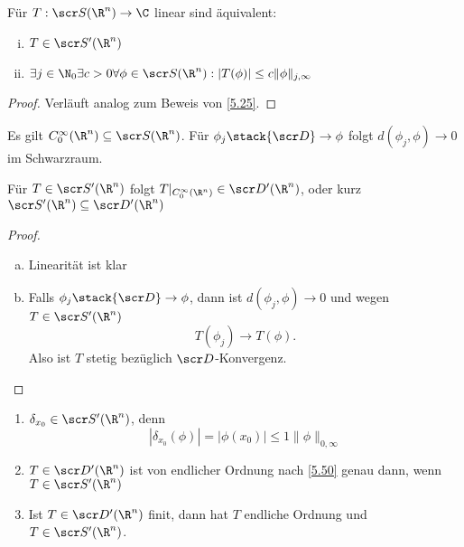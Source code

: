 \begin{st} \label{5.50}
	Für $T : \scr S(\R^n) \to \C$ linear sind äquivalent:
	\begin{enumerate}[(i)]
		\item
			$T \in \scr S'(\R^n)$
		\item
			$\displaystyle \exists j \in \N_0 \exists c > 0 \forall \phi \in \scr S(\R^n) : |T(\phi)| \le c \| \phi\|_{j,\infty}$
	\end{enumerate}
	\begin{proof}
		Verläuft analog zum Beweis von \ref{5.25}.
	\end{proof}
\end{st}

\begin{nt}
	Es gilt $C_0^\infty(\R^n) \subset \scr S(\R^n)$.
	Für $\phi_j \stack{\scr D} \to \phi$ folgt $d(\phi_j, \phi) \to 0$ im Schwarzraum.

	Für $T \in \scr S'(\R^n)$ folgt $T|_{C_0^\infty(\R^n)} \in \scr D'(\R^n)$, oder kurz $\scr S'(\R^n) \subset \scr D'(\R^n)$
	\begin{proof}
		\begin{enumerate}[a)]
			\item
				Linearität ist klar
			\item
				Falls $\phi_j \stack{\scr D}\to \phi$, dann ist $d(\phi_j, \phi) \to 0$ und wegen $T \in \scr S'(\R^n)$
				\[
					T(\phi_j) \to T(\phi).
				\]
				Also ist $T$ stetig bezüglich $\scr D$-Konvergenz.
		\end{enumerate}
	\end{proof}
\end{nt}

\begin{ex} \label{5.52}
	\begin{enumerate}[1)]
		\item
			$\delta_{x_0} \in \scr S'(\R^n)$, denn
			\[
				|\delta_{x_0}(\phi)|
				= |\phi(x_0)|
				\le 1 \|\phi\|_{0,\infty}
			\]
		\item
			$T \in \scr D'(\R^n)$ ist von endlicher Ordnung nach \ref{5.50} genau dann, wenn $T \in \scr S'(\R^n)$
		\item
			Ist $T \in \scr D'(\R^n)$ finit, dann hat $T$ endliche Ordnung und $T \in \scr S'(\R^n)$.
	\end{enumerate}
\end{ex}

